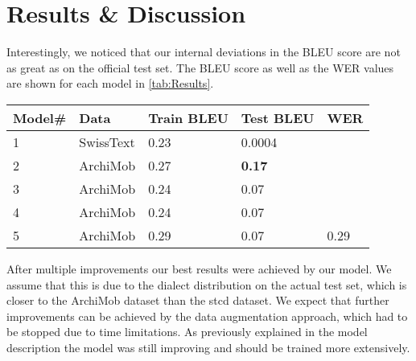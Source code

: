 \section{Results \& Discussion}
Interestingly, we noticed that our internal deviations in the BLEU score are not as great as on the official test set. The BLEU score as well as the WER values are shown for each model in
\cref{tab:Results}.

\begin{table*}[!t]
    \centering
    \begin{tabular}{lllll}
    \hline\textbf{Model\#}    & \textbf{Data} & \textbf{Train BLEU}   & \textbf{Test BLEU}  & \textbf{WER}  \\\hline
    1                   & SwissText     & 0.23                  & 0.0004                    &               \\
    2                   & ArchiMob      & 0.27                  & \textbf{0.17}             &               \\
    3                   & ArchiMob      & 0.24                  & 0.07                      &               \\
    4                   & ArchiMob      & 0.24                  & 0.07                      &               \\
    5                   & ArchiMob      & 0.29                  & 0.07                      & 0.29          \\
    \hline
    \end{tabular}
    \caption{Results}
    \label{tab:Results}
\end{table*}
After multiple improvements our best results were achieved by our  model. We assume that this is due to the dialect distribution on the actual test set, which is closer to the ArchiMob dataset
than the \gls{stcd} dataset. We expect that further improvements can be achieved by the data augmentation approach, which had to be stopped due to time limitations. As previously explained in the
model description the  model was still improving and should be trained more extensively.
